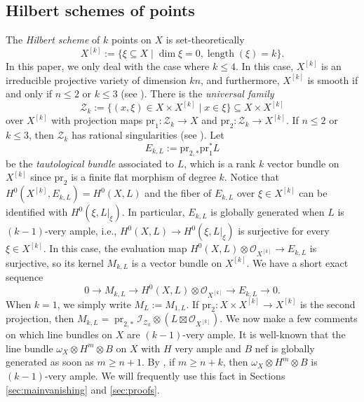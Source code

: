 \documentclass{amsart}
\theoremstyle{plain}
\theoremstyle{definition}
\theoremstyle{remark}
\newcommand{\pr}{\textrm{pr}}
\begin{document}
\subsection{Hilbert schemes of points}
The \emph{Hilbert scheme} of $k$ points on $X$ is set-theoretically
$$
X^{[k]}:= \{ \xi \subseteq X \mid \dim \xi=0, \operatorname{length}(\xi)=k\}.
$$
In this paper, we only deal with the case where $k \leq 4$. In this case, $X^{[k]}$ is an irreducible projective variety of dimension $kn$, and furthermore, $X^{[k]}$ is smooth if and only if $n \leq 2$ or $k \leq 3$ (see \cite{Cheah}). There is the \emph{universal family}
$$
\mathcal{Z}_{k}:=\{ (x, \xi) \in X \times X^{[k]} \mid x \in \xi\} \subseteq X \times X^{[k]}
$$
over $X^{[k]}$ with projection maps $\pr_1 \colon \mathcal{Z}_{k} \to X$ and $\pr_2 \colon \mathcal{Z}_{k} \to X^{[k]}$. If $n \leq 2$ or $k \leq 3$, then $\mathcal{Z}_k$ has rational singularities (see \cite[\S 1.2.4]{Choi.Lacini.Park.Sheridan.25}). Let 
$$
E_{k,L}:=\pr_{2,*} \pr_1^* L
$$
be the \emph{tautological bundle} associated to $L$, which is a rank $k$ vector bundle on $X^{[k]}$ since $\pr_2$ is a finite flat morphism of degree $k$. Notice that $H^0(X^{[k]}, E_{k,L}) = H^0(X, L)$ and the fiber of $E_{k,L}$ over $\xi \in X^{[k]}$ can be identified with $H^0(\xi, L|_{\xi})$. In particular, $E_{k,L}$ is globally generated when $L$ is $(k-1)$-very ample, i.e., $H^0(X, L) \to H^0(\xi, L|_{\xi})$ is surjective for every $\xi \in X^{[k]}$. In this case, the evaluation map $H^0(X, L) \otimes \mathcal{O}_{X^{[k]}} \to E_{k,L}$ is surjective, so its kernel $M_{k,L}$ is a vector bundle on $X^{[k]}$. We have a short exact sequence
$$
0 \longrightarrow M_{k,L} \longrightarrow H^0(X, L) \otimes \mathcal{O}_{X^{[k]}} \longrightarrow E_{k,L} \longrightarrow 0.
$$
When $k=1$, we simply write $M_L:=M_{1,L}$. If $\pr_2 \colon X \times X^{[k]} \to X^{[k]}$ is the second projection, then $M_{k,L} = \operatorname{pr}_{2,*}\mathscr{I}_{\mathcal{Z}_k} \otimes (L \boxtimes \mathcal{O}_{X^{[k]}})$. 
We now make a few comments on which line bundles on $X$ are $(k-1)$-very ample. It is well-known that the line bundle $\omega_X \otimes H^m \otimes B$ on $X$ with $H$ very ample and $B$ nef is globally generated as soon as $m \geq n+1$. By \cite[Theorem 1.1]{HTT}, if $m \geq n+k$, then $\omega_X \otimes H^m \otimes B$ is $(k-1)$-very ample. We will frequently use this fact in Sections \ref{sec:mainvanishing} and \ref{sec:proofs}.

\medskip
\end{document}
